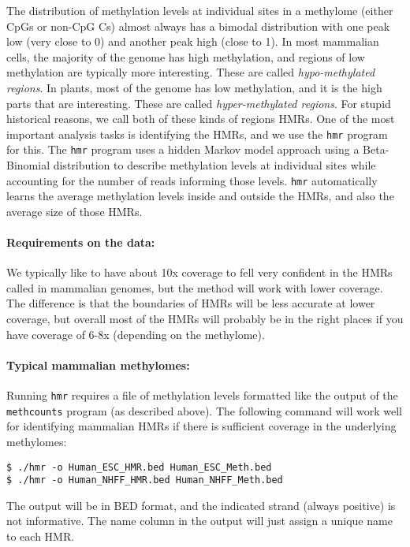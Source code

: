 \documentclass[10pt]{article}
\newcommand{\prog}[1]{\texttt{#1}}
\begin{document}
The distribution of methylation levels at individual sites in a
methylome (either CpGs or non-CpG Cs) almost always has a bimodal
distribution with one peak low (very close to 0) and another peak high
(close to 1). In most mammalian cells, the majority of the genome has
high methylation, and regions of low methylation are typically more
interesting. These are called {\em hypo-methylated regions}. In
plants, most of the genome has low methylation, and it is the high
parts that are interesting. These are called {\em hyper-methylated
  regions}. For stupid historical reasons, we call both of these kinds
of regions HMRs. One of the most important analysis tasks is
identifying the HMRs, and we use the \prog{hmr} program for this. The
\prog{hmr} program uses a hidden Markov model approach using a
Beta-Binomial distribution to describe methylation levels at
individual sites while accounting for the number of reads informing
those levels. \prog{hmr} automatically learns the average methylation
levels inside and outside the HMRs, and also the average size of those
HMRs.

\paragraph{Requirements on the data:} We typically like to have about
10x coverage to fell very confident in the HMRs called in mammalian
genomes, but the method will work with lower coverage. The difference
is that the boundaries of HMRs will be less accurate at lower
coverage, but overall most of the HMRs will probably be in the right
places if you have coverage of 6-8x (depending on the methylome).

\paragraph{Typical mammalian methylomes:}
Running \prog{hmr} requires a file of methylation levels formatted
like the output of the \prog{methcounts} program (as described
above). The following command will work well for identifying mammalian
HMRs if there is sufficient coverage in the underlying methylomes:
\begin{verbatim}
$ ./hmr -o Human_ESC_HMR.bed Human_ESC_Meth.bed
$ ./hmr -o Human_NHFF_HMR.bed Human_NHFF_Meth.bed
\end{verbatim}
The output will be in BED format, and the indicated strand (always
positive) is not informative. The name column in the output will just
assign a unique name to each HMR.
\end{document}
